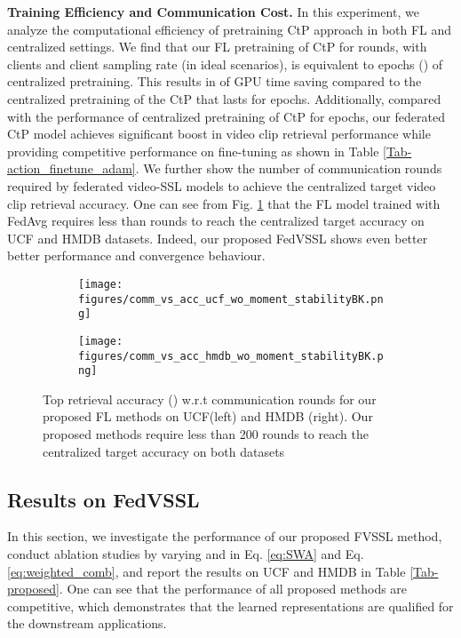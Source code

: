 \noindent \textbf{Training  Efficiency and Communication Cost.} In this experiment, we analyze the computational efficiency of pretraining CtP approach in both FL and centralized settings. We find that our FL pretraining of CtP for  rounds, with  clients and  client sampling rate (in ideal scenarios), is equivalent to  epochs () of centralized pretraining. This results in  of GPU time saving compared to the centralized pretraining of the CtP that lasts for  epochs. Additionally, compared with the performance of centralized pretraining of CtP for  epochs, our federated CtP model achieves significant boost in video clip retrieval performance while providing competitive performance on fine-tuning as shown in Table \ref{Tab-action_finetune_adam}. 
We further show the number of communication rounds required by federated video-SSL models to achieve the centralized target video clip retrieval accuracy. 
One can see from Fig. \ref{fig:comm_vs_no_rounds} that the FL model trained with FedAvg requires less than  rounds to reach the centralized target accuracy on UCF and HMDB datasets. Indeed, our proposed FedVSSL shows even better better performance and convergence behaviour.


\begin{figure}[pt]
    \centering
\begin{subfigure}{0.5\textwidth}
    \centering
    \texttt{[image: figures/comm\_vs\_acc\_ucf\_wo\_moment\_stabilityBK.png]}\\
\end{subfigure}\begin{subfigure}{0.5\textwidth}
    \centering
    \texttt{[image: figures/comm\_vs\_acc\_hmdb\_wo\_moment\_stabilityBK.png]}
\end{subfigure}
    \caption{\small Top  retrieval accuracy () w.r.t communication rounds for our proposed FL methods on UCF(left) and HMDB (right).  Our proposed methods require less than 200 rounds to reach the centralized target accuracy on both datasets}
    \label{fig:comm_vs_no_rounds}
\end{figure}




\subsection{Results on FedVSSL}
\label{sec:propose}

In this section, we investigate the performance of our proposed FVSSL method, conduct ablation studies by varying  and  in Eq. \ref{eq:SWA} and Eq. \ref{eq:weighted_comb}, and report the results on UCF and HMDB in Table \ref{Tab-proposed}. One can see that the performance of all proposed methods are competitive, which demonstrates that the learned representations are qualified for the downstream applications.


